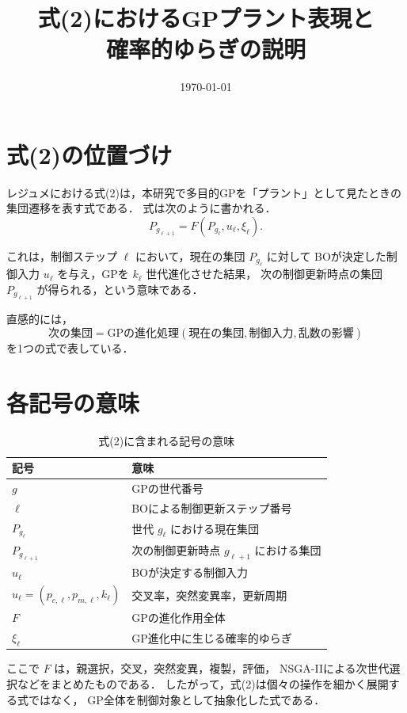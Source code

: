\documentclass[a4paper,11pt]{ltjsarticle}
\title{式(2)におけるGPプラント表現と\\確率的ゆらぎの説明}
\author{}
\date{\today}
\begin{document}
\maketitle

\section{式(2)の位置づけ}

レジュメにおける式(2)は，本研究で多目的GPを「プラント」として見たときの
集団遷移を表す式である．
式は次のように書かれる．
\begin{equation}
P_{g_{\ell+1}}
=
F(P_{g_\ell},u_\ell,\xi_\ell).
\end{equation}

これは，制御ステップ \(\ell\) において，現在の集団 \(P_{g_\ell}\) に対して
BOが決定した制御入力 \(u_\ell\) を与え，GPを \(k_\ell\) 世代進化させた結果，
次の制御更新時点の集団 \(P_{g_{\ell+1}}\) が得られる，という意味である．

直感的には，
\[
\text{次の集団}
=
\text{GPの進化処理}
(\text{現在の集団},\text{制御入力},\text{乱数の影響})
\]
を1つの式で表している．

\section{各記号の意味}

\begin{table}[htbp]
\centering
\caption{式(2)に含まれる記号の意味}
\begin{tabular}{ll}
\toprule
記号 & 意味 \\
\midrule
\(g\) & GPの世代番号 \\
\(\ell\) & BOによる制御更新ステップ番号 \\
\(P_{g_\ell}\) & 世代 \(g_\ell\) における現在集団 \\
\(P_{g_{\ell+1}}\) & 次の制御更新時点 \(g_{\ell+1}\) における集団 \\
\(u_\ell\) & BOが決定する制御入力 \\
\(u_\ell=(p_{c,\ell},p_{m,\ell},k_\ell)\) & 交叉率，突然変異率，更新周期 \\
\(F\) & GPの進化作用全体 \\
\(\xi_\ell\) & GP進化中に生じる確率的ゆらぎ \\
\bottomrule
\end{tabular}
\end{table}

ここで \(F\) は，親選択，交叉，突然変異，複製，評価，
NSGA-IIによる次世代選択などをまとめたものである．
したがって，式(2)は個々の操作を細かく展開する式ではなく，
GP全体を制御対象として抽象化した式である．
\end{document}
